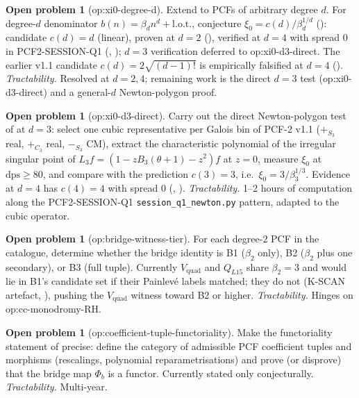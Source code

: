 \documentclass[11pt,reqno]{amsart}
\theoremstyle{plain}
\theoremstyle{definition}
\newtheorem{problem}[theorem]{Open problem}
\theoremstyle{remark}
\newcommand{\Vquad}{V_{\mathrm{quad}}}
\begin{document}
\begin{problem}[\textsf{op:xi0-degree-d}]
Extend  to PCFs of arbitrary degree $d$. For
degree-$d$ denominator $b(n) = \beta_d n^d +
\mathrm{l.o.t.}$, conjecture $\xi_0 = c(d) / \beta_d^{1/d}$
(): candidate $c(d) = d$ (linear),
proven at $d=2$ (), verified at $d=4$
with spread $0$ in PCF2-SESSION-Q1
(, \cite{siarc_pcf2_session_q1});
$d=3$ verification deferred to \textsf{op:xi0-d3-direct}.
The earlier v1.1 candidate $c(d) = 2\sqrt{(d-1)!}$ is
empirically falsified at $d=4$
().
\emph{Tractability.} Resolved at $d=2,4$; remaining work is
the direct $d=3$ test (\textsf{op:xi0-d3-direct}) and a
general-$d$ Newton-polygon proof.
\end{problem}

\begin{problem}[\textsf{op:xi0-d3-direct}]
Carry out the direct Newton-polygon test of
 at $d=3$: select one cubic
representative per Galois bin of PCF-2 v1.1
\cite{siarc_pcf2_v11} ($+_{S_3}$ real, $+_{C_3}$ real,
$-_{S_3}$ CM), extract the characteristic polynomial of the
irregular singular point of $L_3 f = (1 - z B_3(\theta+1) -
z^2) f$ at $z=0$, measure $\xi_0$ at $\mathrm{dps} \ge 80$,
and compare with the prediction $c(3) = 3$, i.e.\
$\xi_0 = 3 / \beta_3^{1/3}$. Evidence at $d=4$ has
$c(4) = 4$ with spread $0$
(, \cite{siarc_pcf2_session_q1}).
\emph{Tractability.} 1--2 hours of computation along the
PCF2-SESSION-Q1 \texttt{session\_q1\_newton.py} pattern,
adapted to the cubic operator.
\end{problem}

\begin{problem}[\textsf{op:bridge-witness-tier}]
For each degree-$2$ PCF in the catalogue, determine whether
the bridge identity is B1 ($\beta_2$ only), B2 ($\beta_2$
plus one secondary), or B3 (full tuple). Currently $\Vquad$
and $Q_{L15}$ share $\beta_2 = 3$ and would lie in B1's
candidate set if their Painlev\'e labels matched; they do
not (K-SCAN artefact, ), pushing the
$\Vquad$ witness toward B2 or higher.
\emph{Tractability.} Hinges on \textsf{op:cc-monodromy-RH}.
\end{problem}

\begin{problem}[\textsf{op:coefficient-tuple-functoriality}]
Make the functoriality statement of 
precise: define the category of admissible PCF coefficient
tuples and morphisms (rescalings, polynomial
reparametrisations) and prove (or disprove) that the bridge
map $\Phi_b$ is a functor. Currently stated only
conjecturally.
\emph{Tractability.} Multi-year.
\end{problem}
\end{document}
